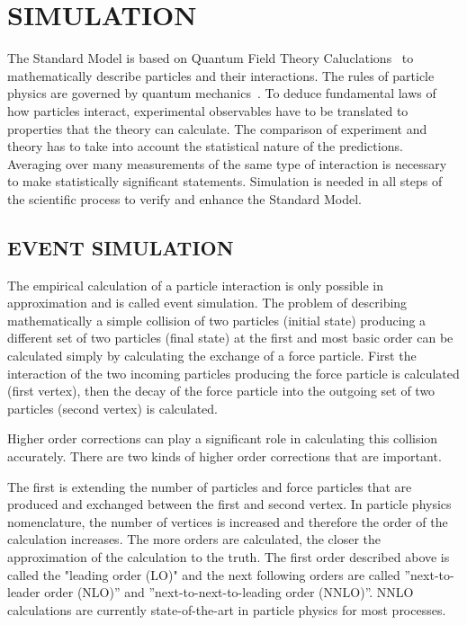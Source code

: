 \documentclass{wscpaperproc}
\theoremstyle{wsc}
\begin{document}
\section{SIMULATION}
\label{sec:simulation}

The Standard Model is based on Quantum Field Theory Caluclations~ to mathematically describe particles and their interactions. The rules of particle physics are governed by quantum mechanics~. To deduce fundamental laws of how particles interact, experimental observables have to be translated to properties that the theory can calculate. The comparison of experiment and theory has to take into account the statistical nature of the predictions. Averaging over many measurements of the same type of interaction is necessary to make statistically significant statements. Simulation is needed in all steps of the scientific process to verify and enhance the Standard Model.

\subsection{EVENT SIMULATION} 
\label{subsec:eventsimulation}

The empirical calculation of a particle interaction is only possible in approximation and is called event simulation. The problem of describing mathematically a simple collision of two particles (initial state) producing a different set of two particles (final state) at the first and most basic order can be calculated simply by calculating the exchange of a force particle. First the interaction of the two incoming particles producing the force particle is calculated (first vertex), then the decay of the force particle into the outgoing set of two particles (second vertex) is calculated.

Higher order corrections can play a significant role in calculating this collision accurately. There are two kinds of higher order corrections that are important. 

The first is extending the number of particles and force particles that are produced and exchanged between the first and second vertex. In particle physics nomenclature, the number of vertices is increased and therefore the order of the calculation increases. The more orders are calculated, the closer the approximation of the calculation to the truth. The first order described above is called the "leading order (LO)" and the next following orders are called ''next-to-leader order (NLO)'' and ''next-to-next-to-leading order (NNLO)''. NNLO calculations are currently state-of-the-art in particle physics for most processes.
\end{document}
